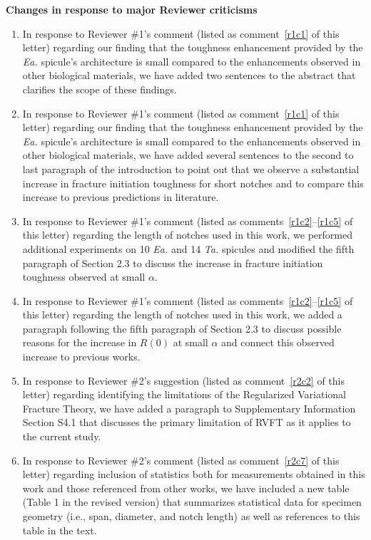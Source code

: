 \documentclass[11pt,letterpaper]{report}
\makeatletter
\newcommand{\TA}{\textit{Ta.\@}\xspace}
\newcommand{\EA}{\textit{Ea.\@}\xspace}
\makeatother
\begin{document}
{\bf Changes in response to major Reviewer criticisms}
\begin{enumerate}[label=\textit{Mc.\arabic*}]
%
\item \label{Mc01} In response to Reviewer \#1's comment (listed as comment~\ref{r1c1} of this letter) regarding our finding that the toughness enhancement provided by the \EA spicule's architecture is small compared to the enhancements observed in other biological materials, we have added two sentences to the abstract that clarifies the scope of these findings.
%
\item \label{Mc02} In response to Reviewer \#1's comment (listed as comment~\ref{r1c1} of this letter) regarding our finding that the toughness enhancement provided by the \EA spicule's architecture is small compared to the enhancements observed in other biological materials, we have added several sentences to the second to last paragraph of the introduction to point out that we observe a substantial increase in fracture initiation toughness for short notches and to compare this increase to previous predictions in literature.
%
\item \label{Mc03} In response to Reviewer \#1's comment (listed as comments~\ref{r1c2}--\ref{r1c5} of this letter) regarding the length of notches used in this work, we performed additional experiments on 10 \EA and 14 \TA spicules and modified the fifth paragraph of Section 2.3 to discuss the increase in fracture initiation toughness observed at small $\alpha$.
%
\item \label{Mc04} In response to Reviewer \#1's comment (listed as comments~\ref{r1c2}--\ref{r1c5} of this letter) regarding the length of notches used in this work, we added a paragraph following the fifth paragraph of Section 2.3 to discuss possible reasons for the increase in $R(0)$ at small $\alpha$ and connect this observed increase to previous works.
%
\item \label{Mc1} In response to Reviewer \#2's suggestion (listed as comment~\ref{r2c2} of this letter) regarding identifying the limitations of the Regularized Variational Fracture Theory, we have added a paragraph to Supplementary Information Section S4.1 that discusses the primary limitation of RVFT as it applies to the current study. 
%
\item \label{Mc2} In response to Reviewer \#2's comment (listed as comment~\ref{r2c7} of this letter) regarding inclusion of statistics both for measurements obtained in this work and those referenced from other works, we have included a new table (Table 1 in the revised version) that summarizes statistical data for specimen geometry (i.e., span, diameter, and notch length) as well as references to this table in the text.

\end{enumerate}
\end{document}
